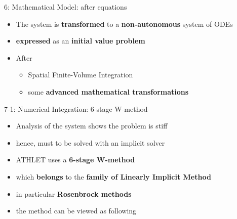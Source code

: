 \fi

\ifSpeech
\begin{frame}[t]{6: Mathematical Model: after equations}
    \justifying
    
    \begin{itemize}
        \setlength\itemsep{0.5cm}
    
        \item The system is \textbf{transformed} to a \textbf{non-autonomous} system of ODEs
        
        \item \textbf{expressed} as an \textbf{initial value problem}
        
        \item  After 
        
        \begin{itemize}
            \item Spatial Finite-Volume Integration
            
            \item some \textbf{advanced mathematical transformations}
        \end{itemize}
        
    \end{itemize}

\end{frame}

\begin{frame}[t]{7-1: Numerical Integration: 6-stage W-method
}
    \justifying

    \begin{itemize}
        \setlength\itemsep{0.5cm}
        
        \item Analysis of the system shows the problem is stiff 
        
        \item hence, must to be solved with an implicit solver
        
        \item ATHLET uses a \textbf{6-stage W-method}
        
        \item which \textbf{belongs} to the \textbf{family of Linearly Implicit Method} 
        
        \item in particular \textbf{Rosenbrock methods}
        
        \item the method can be viewed as following
    \end{itemize}
    
\end{frame}



